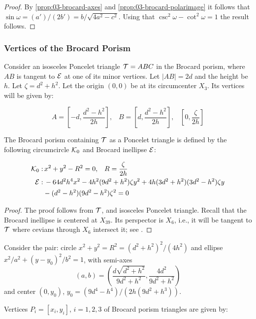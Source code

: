 \begin{proof} By \cref{prop:03-brocard-axes} and \cref{prop:03-brocard-polarimage} it follows that
  $\sin\omega=(a')/(2b')=b/\sqrt{4a^2-c^2}.$
Using that $\csc^2\omega-\cot^2\omega=1$ the result follows.
\end{proof}

\subsubsection{Vertices of the Brocard Porism}

Consider an isosceles Poncelet triangle $\mathcal{T}=ABC$ in the Brocard porism, where $AB$ is tangent to $\mathcal{E}$ at one of its minor vertices. Let $|AB|=2d$ and the height be $h$. Let $\zeta=d^2+h^2$. Let the origin $(0,0)$ be at its circumcenter $X_3$. Its vertices will be given by:

\[A=\left[-d ,\frac{d^2-h^2}{2h}\right], \;\;\; B= \left[d,\frac{d^2-h^2}{2h}\right], \;\;\; \left[0 ,\frac{\zeta}{2h}\right] \]


\begin{proposition}\label{prop:pair_brocard}
The Brocard porism containing $\mathcal{T}$ as a Poncelet triangle is defined by the following circumcircle $\mathcal{K}_0$ and Brocard inellipse $\mathcal{E}$:

\begin{align*}
\mathcal{K}_0:&\, x^2+y^2-R^2=0, \;\;\; R=\frac{\zeta}{2h}\\
\mathcal{E}:&\, -64d^2  h^4  x^2-4  h^2  (9  d^2+h^2)  \zeta  y^2 +4  h  (3  d^2+h^2)  (3  d^2-h^2)  \zeta  y\\&-(d^2-h^2) (9d^2 -h^2) \zeta^2=0
\end{align*}
\end{proposition}

\begin{proof}
The proof follows from $\mathcal{T}$, and isosceles Poncelet triangle. Recall that the Brocard inellipse is centered at $X_{39}$. Its perspector is $X_6$, i.e., it will be tangent to $\mathcal{T}$ where cevians through $X_6$ intersect it; see \cite[Brocard inellipse]{mw}.
\end{proof}

Consider the pair: circle $x^2+y^2=R^2=(d^2+h^2)^2/(4h^2)$ and   ellipse
$x^2/a^2+(y-y_0)^2/b^2=1$, with  semi-axes
 \[  (a,b)=\left(\frac{d\sqrt{d^2+h^2}}{9d^2+h^2},\frac{4d^2}{9d^2+h^2}\right)
    \]
and center $(0,y_0)$,  $y_0=(9d^4 - h^4)/(2h(9d^2  +  h^3))$.

Vertices $P_i=[x_i,y_i]$, $i=1,2,3$ of Brocard porism triangles are given by:

